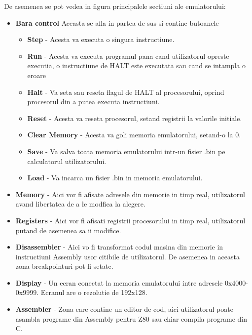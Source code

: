 \documentclass[titlepage,12pt]{article}
\DeclareRobustCommand{\code}[1]{{\ttfamily\small #1}}
\begin{document}
De asemenea se pot vedea in figura principalele sectiuni ale emulatorului:
\begin{itemize}
    \item \textbf{Bara control} Aceasta se afla in partea de sus si contine butoanele
        \begin{itemize}
            \item \textbf{Step} - Acesta va executa o singura instructiune.
            \item \textbf{Run} - Acesta va executa programul pana cand utilizatorul opreste executia, o instructiune de \code{HALT} este executata sau cand se intampla o eroare
            \item \textbf{Halt} - Va seta sau reseta flagul de \code{HALT} al procesorului, oprind procesorul din a putea executa instructiuni.
            \item \textbf{Reset} - Acesta va reseta procesorul, setand registrii la valorile initiale.
            \item \textbf{Clear Memory} - Acesta va goli memoria emulatorului, setand-o la 0.
            \item \textbf{Save} - Va salva toata memoria emulatorului intr-un fisier \code{.bin} pe calculatorul utilizatorului.
            \item \textbf{Load} - Va incarca un fisier \code{.bin} in memoria emulatorului.
        \end{itemize}
    \item \textbf{Memory} - Aici vor fi afisate adresele din memorie in timp real, utilizatorul avand libertatea de a le modfica la alegere.
    \item \textbf{Registers} - Aici vor fi afisati registrii procesorului in timp real, utilizatorul putand de asemenea sa ii modifice.
    \item \textbf{Disassembler} - Aici vo fi transformat codul masina din memorie in instructiuni Assembly usor citibile de utilizatorul. De asemenea in aceasta zona breakpointuri pot fi setate.
    \item \textbf{Display} - Un ecran conectat la memoria emulatorului intre adresele \code{0x4000-0x9999}. Ecranul are o rezolutie de \code{192x128}.
    \item \textbf{Assembler} - Zona care contine un editor de cod, aici utilizatorul poate asambla programe din Assembly pentru \ac {Z80} sau chiar compila programe din C.
\end{itemize}


\clearpage
\end{document}
